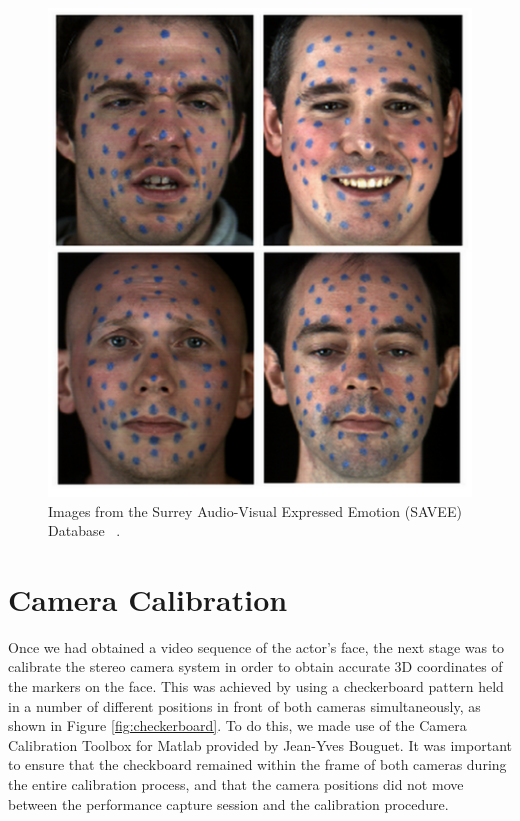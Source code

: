 \begin{figure}[htbp!]
\begin{minipage}[b]{0.5\textwidth}
\includegraphics[width=\textwidth]{img/surreydata}
	\caption{ Images from the Surrey Audio-Visual Expressed Emotion (SAVEE) Database ~\cite{Surrey}.}
	\label{fig:surreydata}	
\end{minipage}
\end{figure}


\section{Camera Calibration}

Once we had obtained a video sequence of the actor's face, the next stage was to calibrate the stereo camera system in order to obtain accurate 3D coordinates of the markers on the face. This was achieved by using a checkerboard pattern held in a number of different positions in front of both cameras simultaneously, as shown in Figure \ref{fig:checkerboard}. To do this, we made use of the Camera Calibration Toolbox for Matlab \cite{Calib} provided by Jean-Yves Bouguet. It was important to ensure that the checkboard remained within the frame of both cameras during the entire calibration process, and that the camera positions did not move between the performance capture session and the calibration procedure. 


